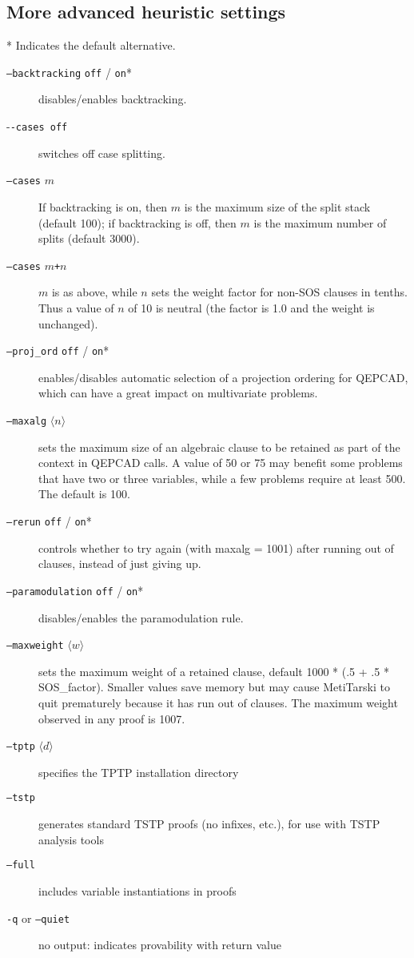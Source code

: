 \documentclass[a4paper,11pt]{scrartcl}
\begin{document}
\subsection{More advanced heuristic settings}
* Indicates the default alternative.

\begin{description}
\item[\texttt{--backtracking} \texttt{off} / \texttt{on}*]
       disables/enables backtracking.
\item[-\texttt{-cases off}]
      switches off case splitting.
\item[\texttt{--cases} $m$]
      If backtracking is on, then $m$ is the maximum size of the split stack (default 100);
      if backtracking is off, then $m$ is the maximum number of splits (default 3000).
\item[\texttt{--cases} $m$\texttt{+}$n$]
      $m$ is as above, while $n$ sets the weight factor for non-SOS clauses in tenths.
      Thus a value of $n$ of 10 is neutral (the factor is 1.0 and the weight is unchanged).
\item[\texttt{--proj\_ord} \texttt{off} / \texttt{on}*]
      enables/disables automatic selection of a projection ordering for QEPCAD, which
      can have a great impact on multivariate problems.
\item[\texttt{--maxalg} $\langle n\rangle$]
      sets the maximum size of an algebraic clause to be retained as part of the context
      in QEPCAD calls. A value of 50 or 75 may benefit some problems that have two or
      three variables, while a few problems require at least 500. The default is 100.
\item[\texttt{--rerun} \texttt{off} / \texttt{on}* ]
      controls whether to try again (with maxalg = 1001) after running out of clauses,
      instead of just giving up.
\item[\texttt{--paramodulation} \texttt{off} / \texttt{on}* ]
      disables/enables the paramodulation rule.
\item[\texttt{--maxweight} $\langle w\rangle$]
      sets the maximum weight of a retained clause, default 1000 * (.5 + .5 * SOS\_factor).
      Smaller values save memory but may cause MetiTarski to quit prematurely because
      it has run out of clauses. The maximum weight observed in any proof is 1007.
\item[\texttt{--tptp} $\langle d\rangle$]
      specifies the TPTP installation directory
\item[\texttt{--tstp}]
      generates standard TSTP proofs (no infixes, etc.), for use with TSTP analysis tools
\item[\texttt{--full}]
      includes variable instantiations in proofs
\item[\texttt{-q} or \texttt{--quiet}]
      no output: indicates provability with return value

\end{description}
\end{document}
